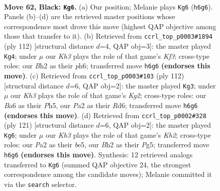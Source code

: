 \documentclass[11pt]{article}
\begin{document}
\clearpage

\begin{figure}[p]\centering
\begin{subfigure}{0.46\textwidth}\centering
\resizebox{\linewidth}{!}{%
\newchessgame
\chessboard[
  setfen={5K2/8/b6k/6p1/8/8/p6b/8 b - - 3 62},
  showmover=false,
  pgfstyle=straightmove, color=movearrow, markmove={h6-g6}
]}
\caption{}
\end{subfigure}\hfill
\begin{subfigure}{0.46\textwidth}\centering
\resizebox{\linewidth}{!}{%
\newchessgame
\chessboard[
  setfen={8/8/7p/8/1b1k4/5KPP/8/1B6 w - - 0 57},
  showmover=false,
  pgfstyle=straightmove, color=movearrow, markmove={f3-g4}
]}
\caption{}
\end{subfigure}
\\[4pt]
\begin{subfigure}{0.46\textwidth}\centering
\resizebox{\linewidth}{!}{%
\newchessgame
\chessboard[
  setfen={6k1/1r6/3R4/7P/8/5P2/6K1/8 w - - 1 57},
  showmover=false,
  pgfstyle=straightmove, color=movearrow, markmove={g2-g3}
]}
\caption{}
\end{subfigure}\hfill
\begin{subfigure}{0.46\textwidth}\centering
\resizebox{\linewidth}{!}{%
\newchessgame
\chessboard[
  setfen={2b5/7k/7p/4B1p1/8/3K4/8/8 b - - 1 61},
  showmover=false,
  pgfstyle=straightmove, color=movearrow, markmove={h7-g6}
]}
\caption{}
\end{subfigure}
\caption{\textbf{Move 62, Black: \texttt{Kg6}.} (a) Our position; Melanie plays \texttt{Kg6} (\texttt{h6g6}). Panels (b)--(d) are the retrieved master positions whose correspondence most drove this move (highest QAP objective among those that transfer to it). (b) Retrieved from \texttt{ccrl\_top\_p0003\#1894} (ply 112) [structural distance $d$=4, QAP obj=3]: the master played \texttt{Kg4}; under $\mu$ our \emph{Kh3} plays the role of that game's \emph{Kf3}; cross-type roles: our \emph{B}h2 as their \emph{p}h6; transferred move \texttt{h6g6} \textbf{(endorses this move)}. (c) Retrieved from \texttt{ccrl\_top\_p0003\#103} (ply 112) [structural distance $d$=6, QAP obj=2]: the master played \texttt{Kg3}; under $\mu$ our \emph{Kh3} plays the role of that game's \emph{Kg2}; cross-type roles: our \emph{B}a6 as their \emph{P}h5, our \emph{P}a2 as their \emph{R}d6; transferred move \texttt{h6g6} \textbf{(endorses this move)}. (d) Retrieved from \texttt{ccrl\_top\_p0002\#328} (ply 121) [structural distance $d$=6, QAP obj=2]: the master played \texttt{Kg6}; under $\mu$ our \emph{Kh3} plays the role of that game's \emph{Kh2}; cross-type roles: our \emph{P}a2 as their \emph{b}e5, our \emph{B}h2 as their \emph{P}g5; transferred move \texttt{h6g6} \textbf{(endorses this move)}. Synthesis: 12 retrieved analogs transferred to \texttt{Kg6} (summed QAP objective 24, the strongest correspondence among the candidate moves); Melanie committed it via the \texttt{search} selector.}
\label{fig:thought-m123}
\end{figure}
\end{document}
